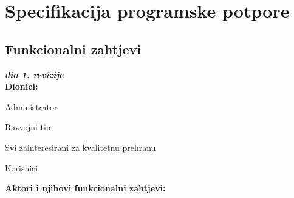 \chapter{Specifikacija programske potpore}
		
	\section{Funkcionalni zahtjevi}
			
			\textbf{\textit{dio 1. revizije}}\\
			
			\noindent \textbf{Dionici:}
			
			\begin{packed_enum}
				\item Administrator
				\item Razvojni tim
				\item Svi zainteresirani za kvalitetnu prehranu
				\item Korisnici
			\end{packed_enum}
			
			\noindent \textbf{Aktori i njihovi funkcionalni zahtjevi:}
			
